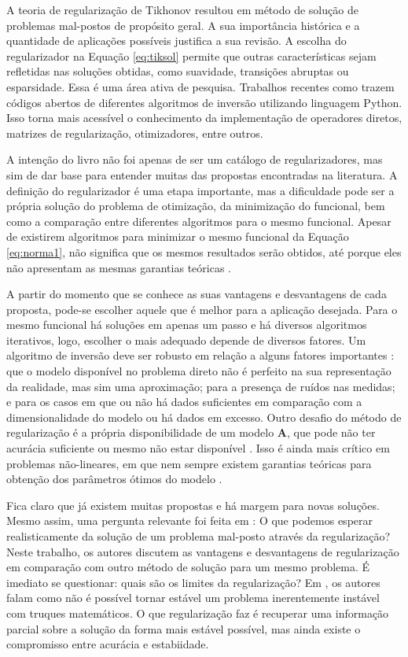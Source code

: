  A teoria de regularização de Tikhonov resultou em método de solução de problemas mal-postos de propósito geral. A sua importância histórica e a quantidade de aplicações possíveis justifica a sua revisão.  A escolha do regularizador na Equação \eqref{eq:tiksol} permite que outras características sejam refletidas nas soluções obtidas, como suavidade, transições abruptas ou esparsidade. Essa é uma área ativa de pesquisa. Trabalhos recentes como \cite{Alghamdi2024, Pasha2024, Riis2024} trazem códigos abertos de diferentes algoritmos de inversão utilizando linguagem Python. Isso torna mais acessível o conhecimento da implementação de operadores diretos, matrizes de regularização, otimizadores, entre outros. 

A intenção do livro não foi apenas de ser um catálogo de regularizadores, mas sim de dar base para entender muitas das propostas encontradas na literatura. A definição do regularizador é uma etapa importante, mas a dificuldade pode ser a própria solução do problema de otimização, da minimização do funcional, bem como a comparação entre diferentes algoritmos para o mesmo funcional. Apesar de existirem algoritmos para minimizar o mesmo funcional da Equação \eqref{eq:norma1}, não significa que os mesmos resultados serão obtidos, até porque eles não apresentam as mesmas garantias teóricas \cite{Daubechies2016}. 

A partir do momento que se conhece as suas vantagens e desvantagens de cada proposta, pode-se escolher aquele que é melhor para a aplicação desejada. Para o mesmo funcional há soluções em apenas um passo e há diversos algoritmos iterativos, logo, escolher o mais adequado depende de diversos fatores.  Um algoritmo de inversão deve ser robusto em relação a alguns fatores importantes  \cite{hansen2010discrete}: que o modelo disponível no problema direto não é perfeito na sua representação da realidade, mas sim uma aproximação; para a presença de ruídos nas medidas; e para os casos em que ou não há dados suficientes em comparação com a dimensionalidade do modelo ou há dados em excesso. Outro desafio do método de regularização é a própria disponibilidade de um modelo $\mathbf{A}$, que pode não ter acurácia suficiente ou mesmo não estar disponível \cite[pág. 3]{Arridge2019}. Isso é ainda mais crítico em problemas não-lineares, em que nem sempre existem garantias teóricas para obtenção dos parâmetros ótimos do modelo \cite{Adler2021}. 

Fica claro que já existem muitas propostas e há margem para novas soluções. Mesmo assim, uma pergunta relevante foi feita em \cite{Arnrich2011}: O que podemos esperar realisticamente da solução de um problema mal-posto através da regularização? Neste trabalho, os autores discutem as vantagens e desvantagens de regularização em comparação com outro método de solução para um mesmo problema. É imediato se questionar: quais são os limites da regularização? Em \cite[pág. 32]{engl1996regularization}, os autores falam como não é possível tornar estável um problema inerentemente instável com truques matemáticos. O que regularização faz é recuperar uma informação parcial sobre a solução da forma mais estável possível, mas ainda existe o compromisso entre acurácia e estabiidade. 

